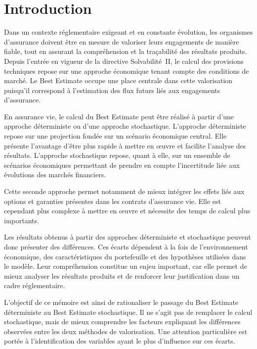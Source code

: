 \chapter*{Introduction}


Dans un contexte réglementaire exigeant et en constante évolution, les organismes d'assurance doivent être en mesure de valoriser leurs engagements de manière fiable, tout en assurant la compréhension et la traçabilité des résultats produits. Depuis l'entrée en vigueur de la directive Solvabilité~II, le calcul des provisions techniques repose sur une approche économique tenant compte des conditions de marché. Le Best Estimate occupe une place centrale dans cette valorisation puisqu'il correspond à l'estimation des flux futurs liés aux engagements d'assurance.

En assurance vie, le calcul du Best Estimate peut être réalisé à partir d'une approche déterministe ou d'une approche stochastique. L'approche déterministe repose sur une projection fondée sur un scénario économique central. Elle présente l'avantage d'être plus rapide à mettre en œuvre et facilite l'analyse des résultats. L'approche stochastique repose, quant à elle, sur un ensemble de scénarios économiques permettant de prendre en compte l'incertitude liée aux évolutions des marchés financiers.

Cette seconde approche permet notamment de mieux intégrer les effets liés aux options et garanties présentes dans les contrats d'assurance vie. Elle est cependant plus complexe à mettre en œuvre et nécessite des temps de calcul plus importants.

Les résultats obtenus à partir des approches déterministe et stochastique peuvent donc présenter des différences. Ces écarts dépendent à la fois de l'environnement économique, des caractéristiques du portefeuille et des hypothèses utilisées dans le modèle. Leur compréhension constitue un enjeu important, car elle permet de mieux analyser les résultats produits et de renforcer leur justification dans un cadre réglementaire.

L'objectif de ce mémoire est ainsi de rationaliser le passage du Best Estimate déterministe au Best Estimate stochastique. Il ne s'agit pas de remplacer le calcul stochastique, mais de mieux comprendre les facteurs expliquant les différences observées entre les deux méthodes de valorisation. Une attention particulière est portée à l'identification des variables ayant le plus d'influence sur ces écarts.


